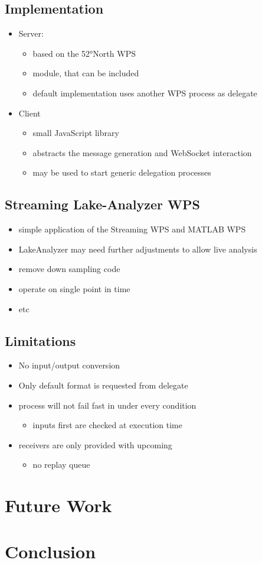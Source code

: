 	\section{Implementation}
	\begin{itemize}
		\item Server:
		\begin{itemize}
			\item based on the 52°North WPS
			\item module, that can be included
			\item default implementation uses another WPS process as delegate
		\end{itemize}
		\item Client
		\begin{itemize}
			\item small JavaScript library
			\item abstracts the message generation and WebSocket interaction
			\item may be used to start generic delegation processes
		\end{itemize}
	\end{itemize}
	\section{Streaming Lake-Analyzer WPS}
	\begin{itemize}
		\item simple application of the Streaming WPS and MATLAB WPS
		\item LakeAnalyzer may need further adjustments to allow live analysis
		\item remove down sampling code
		\item operate on single point in time
		\item etc
	\end{itemize}
	\section{Limitations}
	\begin{itemize}
		\item No input/output conversion
		\item Only default format is requested from delegate
		\item process will not fail fast in under every condition
		\begin{itemize}
			\item inputs first are checked at execution time
		\end{itemize}
		\item receivers are only provided with upcoming
		\begin{itemize}
			\item no replay queue
		\end{itemize}
	\end{itemize}
\chapter{Future Work}
\chapter{Conclusion}